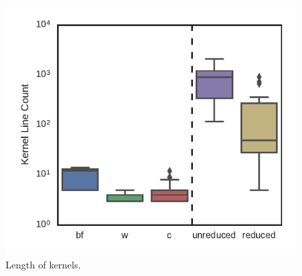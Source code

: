 \begin{figure}
  \centering %
    \includegraphics[width=\columnwidth]{build/img/kernel-sizes}%
  \caption{%
  	Length of kernels.%
  }%
  \label{fig:kernel-sizes} %
\end{figure}
